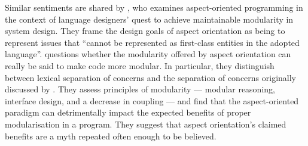 Similar sentiments are shared by \citet{przybylek2010wrong}, who examines
aspect-oriented programming in the context of language designers' quest to
achieve maintainable modularity in system design. They frame the design goals of
aspect orientation as being to represent issues that ``cannot be represented as
first-class entities in the adopted language''. \citeauthor{przybylek2010wrong}
questions whether the modularity offered by aspect orientation can really be
said to make code more modular. In particular, they distinguish between lexical
separation of concerns and the separation of concerns originally discussed by
\citet{djikstra_scientific_thought}. They assess principles of modularity ---
modular reasoning, interface design, and a decrease in coupling --- and find
that the aspect-oriented paradigm can detrimentally impact the expected benefits
of proper modularisation in a program.
They suggest that aspect orientation's claimed benefits are a myth repeated
often enough to be believed.






